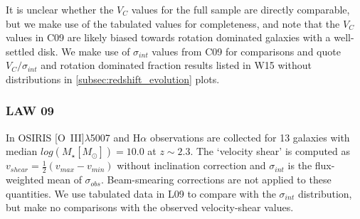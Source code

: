 \documentclass[fleqn,usenatbib]{mn2e}
\begin{document}
It is unclear whether the $V_{C}$ values for the full sample are directly comparable, but we make use of the tabulated values for completeness, and note that the $V_{C}$ values in C09 are likely biased towards rotation dominated galaxies with a well-settled disk.
We make use of $\sigma_{int}$ values from C09 for comparisons and quote $V_{C}/\sigma_{int}$ and rotation dominated fraction results listed in W15 without distributions in \cref{subsec:redshift_evolution} plots.

\subsubsection{LAW 09}\label{subsubsec:law_09}
In \cite[L09]{Law2009} OSIRIS [O~{\sc III}]$\lambda$5007 and H$\alpha$ observations are collected for 13 galaxies with median $log(M_{\star}[M_{\odot}])=10.0$ at $z\sim2.3$.
The `velocity shear' is computed as $v_{shear} = \frac{1}{2}(v_{max} - v_{min})$ without inclination correction and $\sigma_{int}$ is the flux-weighted mean of $\sigma_{obs}$.
Beam-smearing corrections are not applied to these quantities.
We use tabulated data in L09 to compare with the $\sigma_{int}$ distribution, but make no comparisons with the observed velocity-shear values.
\end{document}
